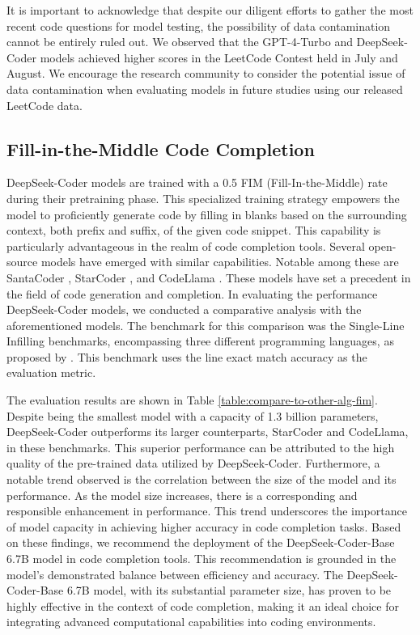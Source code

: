 It is important to acknowledge that despite our diligent efforts to gather the most recent code questions for model testing, the possibility of data contamination cannot be entirely ruled out. We observed that the GPT-4-Turbo and DeepSeek-Coder models achieved higher scores in the LeetCode Contest held in July and August. We encourage the research community to consider the potential issue of data contamination when evaluating models in future studies using our released LeetCode data.

\subsection{Fill-in-the-Middle Code Completion}
\label{sec:code_understanding}
DeepSeek-Coder models are trained with a 0.5 FIM (Fill-In-the-Middle) rate during their pretraining phase. This specialized training strategy empowers the model to proficiently generate code by filling in blanks based on the surrounding context, both prefix and suffix, of the given code snippet. This capability is particularly advantageous in the realm of code completion tools. Several open-source models have emerged with similar capabilities. Notable among these are SantaCoder \citep{allal2023santacoder}, StarCoder \citep{li2023starcoder}, and CodeLlama \citep{roziere2023code}. These models have set a precedent in the field of code generation and completion. In evaluating the performance DeepSeek-Coder models, we conducted a comparative analysis with the aforementioned models. The benchmark for this comparison was the Single-Line Infilling benchmarks, encompassing three different programming languages, as proposed by \citet{allal2023santacoder}. This benchmark uses the line exact match accuracy as the evaluation metric. 

The evaluation results are shown in Table \ref{table:compare-to-other-alg-fim}. Despite being the smallest model with a capacity of 1.3 billion parameters, DeepSeek-Coder outperforms its larger counterparts, StarCoder and CodeLlama, in these benchmarks. This superior performance can be attributed to the high quality of the pre-trained data utilized by DeepSeek-Coder. Furthermore, a notable trend observed is the correlation between the size of the model and its performance. As the model size increases, there is a corresponding and responsible enhancement in performance. This trend underscores the importance of model capacity in achieving higher accuracy in code completion tasks. Based on these findings, we recommend the deployment of the DeepSeek-Coder-Base 6.7B model in code completion tools. This recommendation is grounded in the model's demonstrated balance between efficiency and accuracy. The DeepSeek-Coder-Base 6.7B model, with its substantial parameter size, has proven to be highly effective in the context of code completion, making it an ideal choice for integrating advanced computational capabilities into coding environments.
